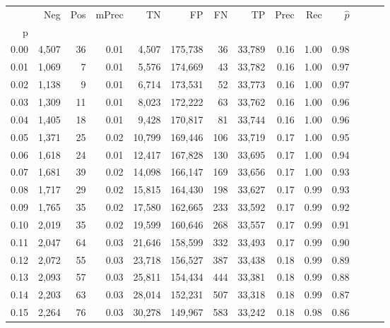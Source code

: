 \begin{tabular}{rrrrrrrrrrrrrr}
\toprule
{} &    Neg &    Pos & mPrec &       TN &       FP &      FN &      TP &  Prec &   Rec & $\hat{p}$ \\
p    &        &        &       &          &          &         &         &       &       &           \\
\midrule
0.00 &  4,507 &     36 &  0.01 &    4,507 &  175,738 &      36 &  33,789 &  0.16 &  1.00 &      0.98 \\
0.01 &  1,069 &      7 &  0.01 &    5,576 &  174,669 &      43 &  33,782 &  0.16 &  1.00 &      0.97 \\
0.02 &  1,138 &      9 &  0.01 &    6,714 &  173,531 &      52 &  33,773 &  0.16 &  1.00 &      0.97 \\
0.03 &  1,309 &     11 &  0.01 &    8,023 &  172,222 &      63 &  33,762 &  0.16 &  1.00 &      0.96 \\
0.04 &  1,405 &     18 &  0.01 &    9,428 &  170,817 &      81 &  33,744 &  0.16 &  1.00 &      0.96 \\
0.05 &  1,371 &     25 &  0.02 &   10,799 &  169,446 &     106 &  33,719 &  0.17 &  1.00 &      0.95 \\
0.06 &  1,618 &     24 &  0.01 &   12,417 &  167,828 &     130 &  33,695 &  0.17 &  1.00 &      0.94 \\
0.07 &  1,681 &     39 &  0.02 &   14,098 &  166,147 &     169 &  33,656 &  0.17 &  1.00 &      0.93 \\
0.08 &  1,717 &     29 &  0.02 &   15,815 &  164,430 &     198 &  33,627 &  0.17 &  0.99 &      0.93 \\
0.09 &  1,765 &     35 &  0.02 &   17,580 &  162,665 &     233 &  33,592 &  0.17 &  0.99 &      0.92 \\
0.10 &  2,019 &     35 &  0.02 &   19,599 &  160,646 &     268 &  33,557 &  0.17 &  0.99 &      0.91 \\
0.11 &  2,047 &     64 &  0.03 &   21,646 &  158,599 &     332 &  33,493 &  0.17 &  0.99 &      0.90 \\
0.12 &  2,072 &     55 &  0.03 &   23,718 &  156,527 &     387 &  33,438 &  0.18 &  0.99 &      0.89 \\
0.13 &  2,093 &     57 &  0.03 &   25,811 &  154,434 &     444 &  33,381 &  0.18 &  0.99 &      0.88 \\
0.14 &  2,203 &     63 &  0.03 &   28,014 &  152,231 &     507 &  33,318 &  0.18 &  0.99 &      0.87 \\
0.15 &  2,264 &     76 &  0.03 &   30,278 &  149,967 &     583 &  33,242 &  0.18 &  0.98 &      0.86 \\

\end{tabular}
